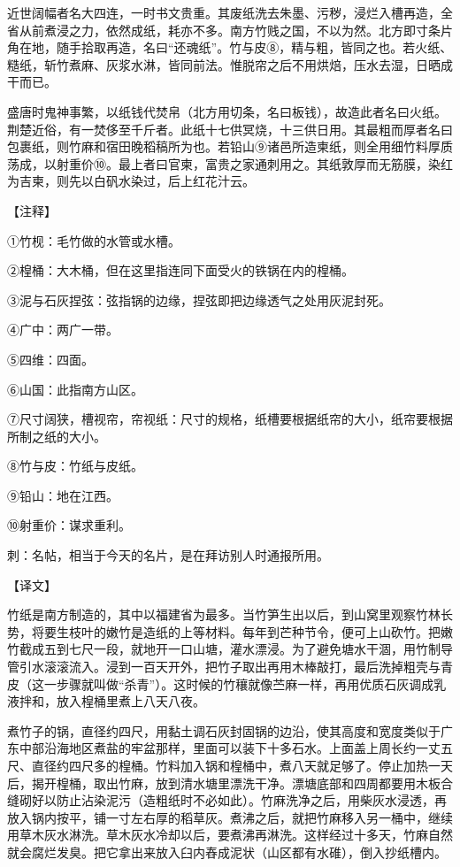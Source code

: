 \documentclass[12pt,UTF8]{ctexbook}
\begin{document}
近世阔幅者名大四连，一时书文贵重。其废纸洗去朱墨、污秽，浸烂入槽再造，全省从前煮浸之力，依然成纸，耗亦不多。南方竹贱之国，不以为然。北方即寸条片角在地，随手拾取再造，名曰“还魂纸”。竹与皮⑧，精与粗，皆同之也。若火纸、糙纸，斩竹煮麻、灰浆水淋，皆同前法。惟脱帘之后不用烘焙，压水去湿，日晒成干而已。

盛唐时鬼神事繁，以纸钱代焚帛（北方用切条，名曰板钱），故造此者名曰火纸。荆楚近俗，有一焚侈至千斤者。此纸十七供冥烧，十三供日用。其最粗而厚者名曰包裹纸，则竹麻和宿田晚稻稿所为也。若铅山⑨诸邑所造柬纸，则全用细竹料厚质荡成，以射重价⑩。最上者曰官柬，富贵之家通刺用之。其纸敦厚而无筋膜，染红为吉柬，则先以白矾水染过，后上红花汁云。

【注释】

①竹枧：毛竹做的水管或水槽。

②楻桶：大木桶，但在这里指连同下面受火的铁锅在内的楻桶。

③泥与石灰捏弦：弦指锅的边缘，捏弦即把边缘透气之处用灰泥封死。

④广中：两广一带。

⑤四维：四面。

⑥山国：此指南方山区。

⑦尺寸阔狭，槽视帘，帘视纸：尺寸的规格，纸槽要根据纸帘的大小，纸帘要根据所制之纸的大小。

⑧竹与皮：竹纸与皮纸。

⑨铅山：地在江西。

⑩射重价：谋求重利。

刺：名帖，相当于今天的名片，是在拜访别人时通报所用。

【译文】

竹纸是南方制造的，其中以福建省为最多。当竹笋生出以后，到山窝里观察竹林长势，将要生枝叶的嫩竹是造纸的上等材料。每年到芒种节令，便可上山砍竹。把嫩竹截成五到七尺一段，就地开一口山塘，灌水漂浸。为了避免塘水干涸，用竹制导管引水滚滚流入。浸到一百天开外，把竹子取出再用木棒敲打，最后洗掉粗壳与青皮（这一步骤就叫做“杀青”）。这时候的竹穰就像苎麻一样，再用优质石灰调成乳液拌和，放入楻桶里煮上八天八夜。

煮竹子的锅，直径约四尺，用黏土调石灰封固锅的边沿，使其高度和宽度类似于广东中部沿海地区煮盐的牢盆那样，里面可以装下十多石水。上面盖上周长约一丈五尺、直径约四尺多的楻桶。竹料加入锅和楻桶中，煮八天就足够了。停止加热一天后，揭开楻桶，取出竹麻，放到清水塘里漂洗干净。漂塘底部和四周都要用木板合缝砌好以防止沾染泥污（造粗纸时不必如此）。竹麻洗净之后，用柴灰水浸透，再放入锅内按平，铺一寸左右厚的稻草灰。煮沸之后，就把竹麻移入另一桶中，继续用草木灰水淋洗。草木灰水冷却以后，要煮沸再淋洗。这样经过十多天，竹麻自然就会腐烂发臭。把它拿出来放入臼内舂成泥状（山区都有水碓），倒入抄纸槽内。
\end{document}
